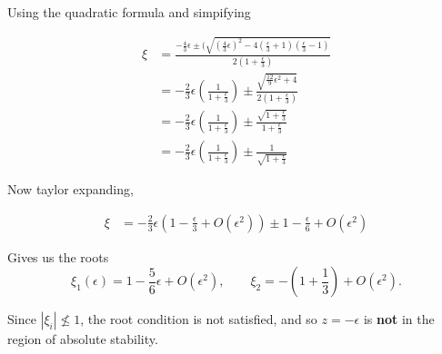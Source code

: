 \documentclass{article}
\begin{document}
 Using the quadratic formula and simpifying

 \begin{align*}
   \xi &= \frac{ - \frac{4}{3} \epsilon \pm ( \sqrt{(\frac{4}{3}\epsilon)^{2}
   - 4  (\frac{\epsilon}{3} + 1)( \frac{\epsilon}{3} -1)}}{2 (1
 + \frac{\epsilon}{3})} \\
       &= -\frac{2}{3} \epsilon \left( \frac{1}{1+ \frac{\epsilon}{3}}\right)
       \pm \frac{ \sqrt{ \frac{12}{9}\epsilon^{2}+4} }{2 (1+
       \frac{\epsilon}{3})} \\
       &= -\frac{2}{3} \epsilon \left( \frac{1}{1+ \frac{\epsilon}{3}}\right)
       \pm \frac{ \sqrt{1 + \frac{\epsilon}{3}} }{1 + \frac{\epsilon}{3}} \\
       &= -\frac{2}{3} \epsilon \left( \frac{1}{1+ \frac{\epsilon}{3}}\right)
       \pm \frac{1}{\sqrt{1 + \frac{\epsilon}{3}}}
 \end{align*}

 Now taylor expanding,

 \begin{align*}
   \xi &= - \frac{2}{3}\epsilon \left( 1- \frac{\epsilon}{3} + O(
   \epsilon^{2})\right) \pm 1 - \frac{\epsilon}{6} + O(\epsilon^{2})
 \end{align*}

 Gives us the roots
  \[
    \xi_1 (\epsilon) = 1 - \frac{5}{6}\epsilon + O(\epsilon^{2}), \qquad \xi_2
    = - \left(1 + \frac{1}{3}\right) + O(\epsilon^{2})
  .\] 

  Since $|\xi_i|\nleq 1$, the root condition is not satisfied, and so
  $z=-\epsilon$ is \textbf{not} in the region of absolute stability.
  
\end{document}
